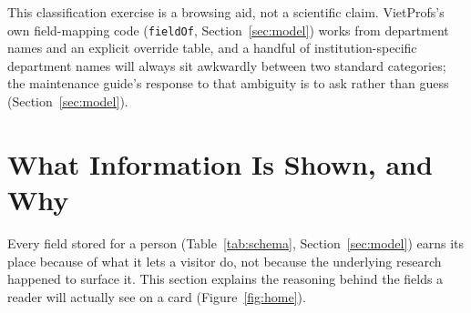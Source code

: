 \documentclass[11pt]{article}
\newcommand{\code}[1]{\texttt{\small #1}}
\begin{document}
This classification exercise is a browsing aid, not a scientific claim.
VietProfs's own field-mapping code (\code{fieldOf}, Section~\ref{sec:model}) works from department names and an explicit override table, and a handful of institution-specific department names will always sit awkwardly between two standard categories; the maintenance guide's response to that ambiguity is to ask rather than guess (Section~\ref{sec:model}).

\section{What Information Is Shown, and Why}
\label{sec:whatshown}
Every field stored for a person (Table~\ref{tab:schema}, Section~\ref{sec:model}) earns its place because of what it lets a visitor do, not because the underlying research happened to surface it.
This section explains the reasoning behind the fields a reader will actually see on a card (Figure~\ref{fig:home}).
\end{document}

